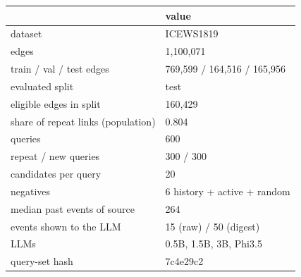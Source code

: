 \begin{tabular}{ll}
\toprule
 & value \\
\midrule
dataset & ICEWS1819 \\
edges & 1,100,071 \\
train / val / test edges & 769,599 / 164,516 / 165,956 \\
evaluated split & test \\
eligible edges in split & 160,429 \\
share of repeat links (population) & 0.804 \\
queries & 600 \\
repeat / new queries & 300 / 300 \\
candidates per query & 20 \\
negatives & 6 history + active + random \\
median past events of source & 264 \\
events shown to the LLM & 15 (raw) / 50 (digest) \\
LLMs & 0.5B, 1.5B, 3B, Phi3.5 \\
query-set hash & 7c4e29c2 \\
\bottomrule
\end{tabular}
